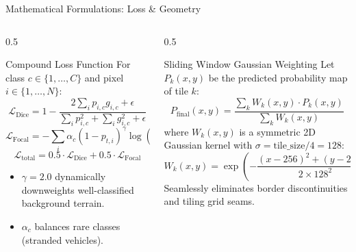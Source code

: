 \documentclass[aspectratio=169, 10pt, professionalfonts]{beamer}
\begin{document}
\begin{frame}{Mathematical Formulations: Loss \& Geometry}
  \begin{columns}[T]
    \begin{column}{0.5\textwidth}
      \begin{block}{Compound Loss Function}
        \footnotesize
        For class $c \in \{1, \dots, C\}$ and pixel $i \in \{1, \dots, N\}$:
        $$\mathcal{L}_{\text{Dice}} = 1 - \frac{2 \sum_i p_{i,c} g_{i,c} + \epsilon}{\sum_i p_{i,c}^2 + \sum_i g_{i,c}^2 + \epsilon}$$
        $$\mathcal{L}_{\text{Focal}} = -\sum_i \alpha_c (1 - p_{t,i})^\gamma \log(p_{t,i})$$
        $$\mathcal{L}_{\text{total}} = 0.5 \cdot \mathcal{L}_{\text{Dice}} + 0.5 \cdot \mathcal{L}_{\text{Focal}}$$
        \begin{itemize}\scriptsize
          \item $\gamma = 2.0$ dynamically downweights well-classified background terrain.
          \item $\alpha_c$ balances rare classes (stranded vehicles).
        \end{itemize}
      \end{block}
    \end{column}
    
    \begin{column}{0.5\textwidth}
      \begin{block}{Sliding Window Gaussian Weighting}
        \footnotesize
        Let $P_k(x, y)$ be the predicted probability map of tile $k$:
        $$P_{\text{final}}(x, y) = \frac{\sum_k W_k(x, y) \cdot P_k(x, y)}{\sum_k W_k(x, y)}$$
        where $W_k(x, y)$ is a symmetric 2D Gaussian kernel with $\sigma = \text{tile\_size} / 4 = 128$:
        $$W_k(x, y) = \exp\left( -\frac{(x - 256)^2 + (y - 256)^2}{2 \times 128^2} \right)$$
        Seamlessly eliminates border discontinuities and tiling grid seams.
      \end{block}
    \end{column}
  \end{columns}
\end{frame}
\end{document}
